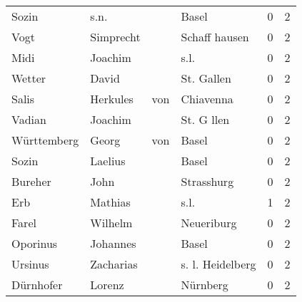 \begin{center}
\begin{tiny}
\begin{longtabu}{llllrr}
                    Sozin &                               s.n. &             &                                       Basel &          0 &         2 \\
                     Vogt &                          Simprecht &             &                               Schaff hausen &          0 &         2 \\
                     Midi &                            Joachim &             &                                        s.l. &          0 &         2 \\
                   Wetter &                              David &             &                                  St. Gallen &          0 &         2 \\
                    Salis &                           Herkules &         von &                                   Chiavenna &          0 &         2 \\
                   Vadian &                            Joachim &             &                                  St. G llen &          0 &         2 \\
              Württemberg &                              Georg &         von &                                       Basel &          0 &         2 \\
                    Sozin &                            Laelius &             &                                       Basel &          0 &         2 \\
                  Bureher &                               John &             &                                  Strasshurg &          0 &         2 \\
                      Erb &                            Mathias &             &                                        s.l. &          1 &         2 \\
                    Farel &                            Wilhelm &             &                                  Neueriburg &          0 &         2 \\
                 Oporinus &                           Johannes &             &                                       Basel &          0 &         2 \\
                  Ursinus &                          Zacharias &             &                            s. l. Heidelberg &          0 &         2 \\
                Dürnhofer &                             Lorenz &             &                                    Nürnberg &          0 &         2 \\

\end{longtabu}
\end{tiny}
\end{center}
